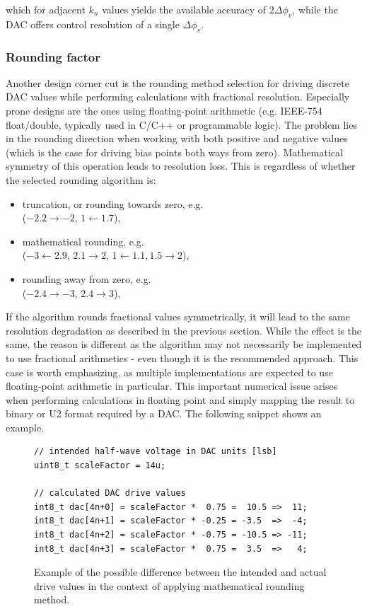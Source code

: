 \documentclass[journal,twoside,web]{ieeecolor}
\begin{document}
\noindent
which for adjacent $k_{n}$ values yields the available accuracy of $2\Delta\phi_{v}$, while the DAC offers control resolution of a single $\Delta\phi_{v}$.

\subsubsection{Rounding factor}
Another design corner cut is the rounding method selection for driving discrete DAC values while performing calculations with fractional resolution. Especially prone designs are the ones using floating-point arithmetic (e.g. IEEE-754 float/double, typically used in C/C++ or programmable logic). The problem lies in the rounding direction when working with both positive and negative values (which is the case for driving bias points both ways from zero). Mathematical symmetry of this operation leads to resolution loss. This is regardless of whether the selected rounding algorithm is:
\begin{itemize}
    \item truncation, or rounding towards zero, e.g. \\
          ($-2.2 \rightarrow -2$, $1 \leftarrow 1.7$),
    \item mathematical rounding, e.g. \\
          ($-3 \leftarrow 2.9$, $2.1 \rightarrow 2$, $1 \leftarrow 1.1, 1.5 \rightarrow 2$),
    \item rounding away from zero, e.g. \\
          ($-2.4 \rightarrow -3$, $2.4 \rightarrow 3$),
\end{itemize}

\noindent
If the algorithm rounds fractional values symmetrically, it will lead to the same resolution degradation as described in the previous section. While the effect is the same, the reason is different as the algorithm may not necessarily be implemented to use fractional arithmetics - even though it is the recommended approach. This case is worth emphasizing, as multiple implementations are expected to use floating-point arithmetic in particular. This important numerical issue arises when performing calculations in floating point and simply mapping the result to binary or U2 format required by a DAC. The following snippet shows an example.

\begin{figure}[ht]
    \centering
    {\scriptsize\begin{verbatim}
// intended half-wave voltage in DAC units [lsb]
uint8_t scaleFactor = 14u; 

// calculated DAC drive values
int8_t dac[4n+0] = scaleFactor *  0.75 =  10.5 =>  11;
int8_t dac[4n+1] = scaleFactor * -0.25 = -3.5  =>  -4;
int8_t dac[4n+2] = scaleFactor * -0.75 = -10.5 => -11;
int8_t dac[4n+3] = scaleFactor *  0.75 =  3.5  =>   4;
    \end{verbatim}}
    \caption{Example of the possible difference between the intended and actual drive values in the context of applying mathematical rounding method.}
    \label{fig:snippet_rounding}
\end{figure}
\end{document}
